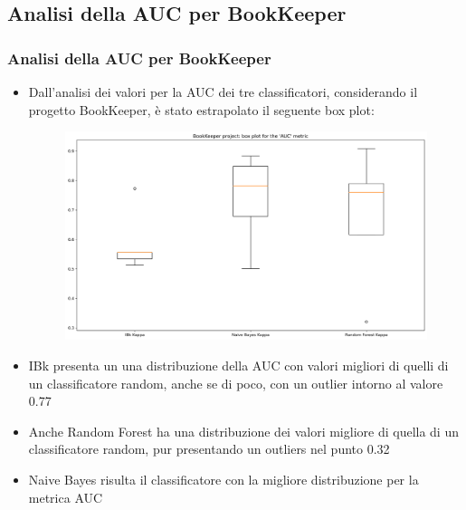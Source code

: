 \documentclass[10pt]{beamer}
\begin{document}
\begin{frame}
\section{Analisi della AUC per BookKeeper}
\frametitle{Analisi della AUC per BookKeeper}
\begin{itemize}
\item Dall'analisi dei valori per la AUC dei tre classificatori, considerando il progetto BookKeeper, è stato estrapolato il seguente box plot:
\begin{figure}
\includegraphics[scale=0.25]{images/auc_base_bk}
\end{figure}
\item IBk presenta un una distribuzione della AUC con valori migliori di quelli di un classificatore random, anche se di poco, con un outlier intorno al valore 0.77
\item Anche Random Forest ha una distribuzione dei valori migliore di quella di un classificatore random, pur presentando un outliers nel punto 0.32
\item Naive Bayes risulta il classificatore con la migliore distribuzione per la metrica AUC
\end{itemize}
\end{frame}
\end{document}
